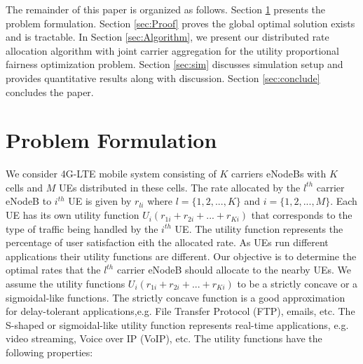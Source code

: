 \documentclass[conference]{IEEEtran}
\begin{document}
The remainder of this paper is organized as follows. Section \ref{sec:Problem_formulation} presents the problem formulation. Section \ref{sec:Proof} proves the global optimal solution exists and is tractable. In Section \ref{sec:Algorithm}, we present our distributed rate allocation algorithm with joint carrier aggregation for the utility proportional fairness optimization problem. Section \ref{sec:sim} discusses simulation setup and provides quantitative results along with discussion. Section \ref{sec:conclude} concludes the paper.


\section{Problem Formulation}\label{sec:Problem_formulation}

We consider 4G-LTE mobile system consisting of $K$ carriers eNodeBs with $K$ cells and $M$ UEs distributed in these cells. The rate allocated by the $l^{th}$ carrier eNodeB to $i^{th}$ UE is given by $r_{li}$ where $l =\{1,2, ..., K\}$ and $i = \{1,2, ...,M\}$. Each UE has its own utility function $U_i(r_{1i}+r_{2i}+ ...+r_{Ki})$ that corresponds to the type of traffic being handled by the $i^{th}$ UE. The utility function represents the percentage of user satisfaction eith the allocated rate. As UEs run different applications their utility functions are different. Our objective is to determine the optimal rates that the $l^{th}$ carrier eNodeB should allocate to the nearby UEs. We assume the utility functions $U_i(r_{1i}+r_{2i}+ ...+r_{Ki})$ to be a strictly concave or a sigmoidal-like functions. The strictly concave function is a good approximation for delay-tolerant applications,e.g. File Transfer Protocol (FTP), emails, etc. The S-shaped or sigmoidal-like utility function represents real-time 
applications, e.g. video streaming, Voice over IP (VoIP), etc. The utility functions have the following properties: 
\end{document}
